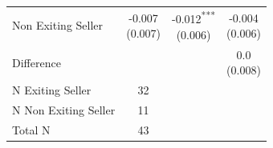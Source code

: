 \begin{tabular}{l|ccc}
Non Exiting Seller & \makecell{-0.007 \\ (0.007)\\[0.25em]} & \makecell{-0.012\textsuperscript{***} \\ (0.006)\\[0.25em]} & \makecell{-0.004 \\ (0.006)\\[0.25em]} \\
Difference &  &  & \makecell{0.0 \\ (0.008)\\[0.25em]} \\
\midrule
N Exiting Seller & 32 \\
N Non Exiting Seller & 11 \\
Total N & 43 \\
\bottomrule
\end{tabular}
